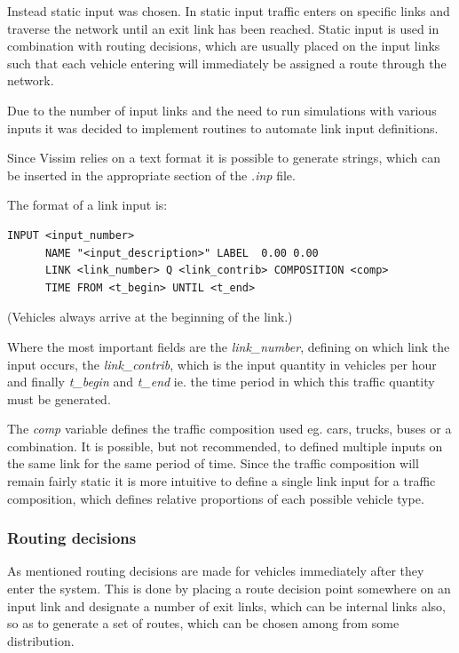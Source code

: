 Instead static input was chosen. In static input traffic enters on specific links and traverse the network until an exit link has been reached. Static input is used in combination with routing decisions, which are usually placed on the input links such that each vehicle entering will immediately be assigned a route through the network.

Due to the number of input links and the need to run simulations with various inputs it was decided to implement routines to automate link input definitions.

Since Vissim relies on a text format it is possible to generate strings, which can be inserted in the appropriate section of the \textit{.inp} file.

The format of a link input is:
\begin{verbatim}
INPUT <input_number>
      NAME "<input_description>" LABEL  0.00 0.00
      LINK <link_number> Q <link_contrib> COMPOSITION <comp>
      TIME FROM <t_begin> UNTIL <t_end>
\end{verbatim}

(Vehicles always arrive at the beginning of the link.)

Where the most important fields are the \textit{link\_number}, defining on which link the input occurs, the \textit{link\_contrib}, which is the input quantity in vehicles per hour and finally \textit{t\_begin} and \textit{t\_end} ie. the time period in which this traffic quantity must be generated.

The \textit{comp} variable defines the traffic composition used eg. cars, trucks, buses or a combination. It is possible, but not recommended, to defined multiple inputs on the same link for the same period of time. Since the traffic composition will remain fairly static it is more intuitive to define a single link input for a traffic composition, which defines relative proportions of each possible vehicle type.

\subsubsection{Routing decisions}
\label{routingdecisions}
As mentioned routing decisions are made for vehicles immediately after they enter the system. This is done by placing a route decision point somewhere on an input link and designate a number of exit links, which can be internal links also, so as to generate a set of routes, which can be chosen among from some distribution.

